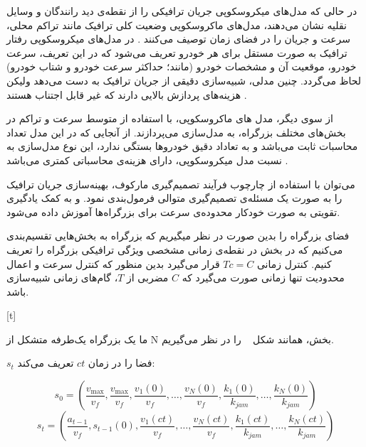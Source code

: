در حالی که مدل‌های میکروسکوپی جریان ترافیکی را از نقطه‌ی دید رانندگان و وسایل نقلیه نشان می‌دهند، مدل‌های ماکروسکوپی وضعیت کلی ترافیک  مانند تراکم محلی، سرعت و جریان را در فضای زمان توصیف می‌کنند \cite{Treiber2013}.
در مدل‌های میکروسکوپی رفتار ترافیک به صورت مستقل برای هر خودرو تعریف می‌شود که در این تعریف، سرعت خودرو، موقعیت آن و مشخصات خودرو (مانند؛ حداکثر سرعت خودرو و شتاب خودرو) لحاظ می‌گردد. چنین مدلی، شبیه‌سازی دقیقی از جریان ترافیک به دست می‌دهد ولیکن هزینه‌های پردازش بالایی دارند که غیر قابل اجتناب هستند \cite{Walraven2016}.

از سوی دیگر، مدل های ماکروسکوپی، با استفاده از متوسط سرعت و تراکم در بخش‌های مختلف بزرگراه، به مدل‌سازی می‌پردازند.
از آنجایی که در این مدل تعداد محاسبات ثابت می‌باشد و به تعاداد دقیق خودروها بستگی ندارد، این نوع مدل‌سازی به نسبت مدل میکروسکوپی، دارای هزینه‌ی محاسباتی کمتری می‌باشد \cite{Walraven2016}.
%

می‌توان با استفاده از چارچوب فرآیند تصمیم‌گیری مارکوف، بهینه‌سازی جریان ترافیک را به صورت یک مسئله‌ی تصمیم‌گیری متوالی فرمول‌بندی نمود. و به کمک یادگیری تقویتی به صورت خودکار محدوده‌ی سرعت برای بزرگراه‌ها آموزش داده می‌شود.

فضای بزرگراه را بدین صورت در نظر میگیریم که بزرگراه به بخش‌هایی تقسیم‌بندی می‌کنیم که در بخش در نقطه‌ی زمانی مشخصی ویژگی ترافیکی بزرگراه را تعریف کنیم. کنترل زمانی $Tc =C$ قرار می‌گیرد بدین منظور که کنترل سرعت و اعمال محدودیت تنها زمانی صورت می‌گیرد که $C$ مضربی از $T$، گام‌های زمانی شبیه‌سازی باشد.

[t]

ما یک بزرگراه یک‌طرفه متشکل از N بخش، همانند شکل ~ را در نظر می‌گیریم.

$s_{t}$ فضا را در زمان $ct$ تعریف می‌کند:

\begin{equation}
s _ { 0 } = \left( \frac { v _ { \max } } { v _ { f } } , \frac { v _ { \max } } { v _ { f } } , \frac { v _ { 1 } ( 0 ) } { v _ { f } } , \dots , \frac { v _ { N } ( 0 ) } { v _ { f } } , \frac { k _ { 1 } ( 0 ) } { k _ { j a m } } , \dots , \frac { k _ { N } ( 0 ) } { k _ { j a m } } \right)
\end{equation}
\begin{equation}
s _ { t } = \left( \frac { a _ { t - 1 } } { v _ { f } } , s _ { t - 1 } ( 0 ) , \frac { v _ { 1 } ( c t ) } { v _ { f } } , \dots , \frac { v _ { N } ( c t ) } { v _ { f } } , \frac { k _ { 1 } ( c t ) } { k _ { j a m } } , \dots , \frac { k _ { N } ( c t ) } { k _ { j a m } } \right)
\end{equation}

